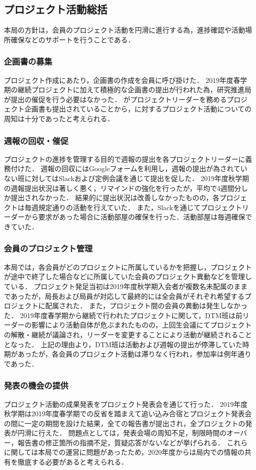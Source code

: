 \subsection*{プロジェクト活動総括}

本局の方針は，会員のプロジェクト活動を円滑に進行する為，進捗確認や活動場所確保などのサポートを行うことである．

\subsubsection*{企画書の募集}
	
プロジェクト作成にあたり，企画書の作成を会員に呼び掛けた．
2019年度春学期の継続プロジェクトに加えて積極的な企画書の提出が行われた為，研究推進局が提出の催促を行う必要はなかった．
\firstGrade{}がプロジェクトリーダーを務めるプロジェクト企画書も提出されていることから，\firstGrade{}に対するプロジェクト活動についての周知は十分であったと考えられる．

\subsubsection*{週報の回収・催促}

プロジェクトの進捗を管理する目的で週報の提出を各プロジェクトリーダーに義務付けた．
週報の回収にはGoogleフォームを利用し，週報の提出が為されていない班に対してはSlackおよび定例会議を通じて提出を促した．
2019年度秋学期の週報提出状況は著しく悪く，リマインドの強化を行ったが，平均で4週間分しか提出されなかった．
結果的に提出状況は改善しなかったものの，各プロジェクトは毎週規定通りの活動を行えていた．
また，Slackを通じてプロジェクトリーダーから要求があった場合に活動部屋の確保を行った．活動部屋は毎週確保できていた．

\subsubsection*{会員のプロジェクト管理}

本局では，各会員がどのプロジェクトに所属しているかを把握し，プロジェクトが途中で終了した場合などに所属していた会員のプロジェクト異動などを管理している．
プロジェクト発足当初は2019年度秋学期入会者が複数名未配属のままであったが，局長および局員が対応して最終的には全会員がそれぞれ希望するプロジェクトに配属された．
また，プロジェクト間の会員の異動は発生しなかった．
2019年度春学期から継続で行われたプロジェクトに関して，DTM班は前リーダーの影響により活動自体が危ぶまれたものの，上回生会議にてプロジェクトの解散・継続が議論され，リーダーを変更することにより活動が継続されることとなった．
上記の理由より，DTM班は活動および週報の提出が停滞していた時期があったが，各会員のプロジェクト活動は滞りなく行われ，参加率は例年通りであった．

\subsubsection*{発表の機会の提供}

プロジェクト活動の成果発表をプロジェクト発表会を通じて行った．
2019年度秋学期は2019年度春学期での反省を踏まえて追い込み合宿とプロジェクト発表会の間に一定の期間を設けた結果，全ての報告書が提出され，全プロジェクトの発表が円滑に行えた．
問題点としては，発表会場の周知不足，制限時間のオーバー，報告書の修正箇所の指摘不足，質疑応答がないなどが挙げられる．
これらに関しては本局での運営に問題があったため，2020年度からは局内での情報の共有を徹底する必要があると考えられる．